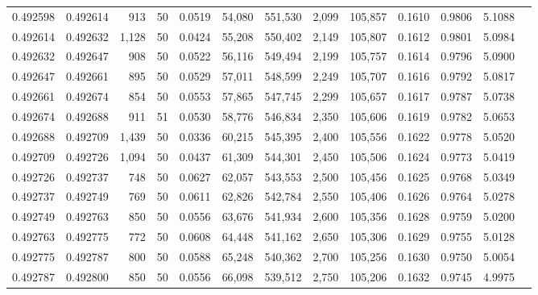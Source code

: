 \begin{tabular}{rrrrrrrrrrrrr}
0.492598 & 0.492614 &   913 &  50 &                                     0.0519 &  54,080 & 551,530 &   2,099 & 105,857 & 0.1610 & 0.9806 & 5.1088 \\
0.492614 & 0.492632 & 1,128 &  50 &                                     0.0424 &  55,208 & 550,402 &   2,149 & 105,807 & 0.1612 & 0.9801 & 5.0984 \\
0.492632 & 0.492647 &   908 &  50 &                                     0.0522 &  56,116 & 549,494 &   2,199 & 105,757 & 0.1614 & 0.9796 & 5.0900 \\
0.492647 & 0.492661 &   895 &  50 &                                     0.0529 &  57,011 & 548,599 &   2,249 & 105,707 & 0.1616 & 0.9792 & 5.0817 \\
0.492661 & 0.492674 &   854 &  50 &                                     0.0553 &  57,865 & 547,745 &   2,299 & 105,657 & 0.1617 & 0.9787 & 5.0738 \\
0.492674 & 0.492688 &   911 &  51 &                                     0.0530 &  58,776 & 546,834 &   2,350 & 105,606 & 0.1619 & 0.9782 & 5.0653 \\
0.492688 & 0.492709 & 1,439 &  50 &                                     0.0336 &  60,215 & 545,395 &   2,400 & 105,556 & 0.1622 & 0.9778 & 5.0520 \\
0.492709 & 0.492726 & 1,094 &  50 &                                     0.0437 &  61,309 & 544,301 &   2,450 & 105,506 & 0.1624 & 0.9773 & 5.0419 \\
0.492726 & 0.492737 &   748 &  50 &                                     0.0627 &  62,057 & 543,553 &   2,500 & 105,456 & 0.1625 & 0.9768 & 5.0349 \\
0.492737 & 0.492749 &   769 &  50 &                                     0.0611 &  62,826 & 542,784 &   2,550 & 105,406 & 0.1626 & 0.9764 & 5.0278 \\
0.492749 & 0.492763 &   850 &  50 &                                     0.0556 &  63,676 & 541,934 &   2,600 & 105,356 & 0.1628 & 0.9759 & 5.0200 \\
0.492763 & 0.492775 &   772 &  50 &                                     0.0608 &  64,448 & 541,162 &   2,650 & 105,306 & 0.1629 & 0.9755 & 5.0128 \\
0.492775 & 0.492787 &   800 &  50 &                                     0.0588 &  65,248 & 540,362 &   2,700 & 105,256 & 0.1630 & 0.9750 & 5.0054 \\
0.492787 & 0.492800 &   850 &  50 &                                     0.0556 &  66,098 & 539,512 &   2,750 & 105,206 & 0.1632 & 0.9745 & 4.9975 \\

\end{tabular}
